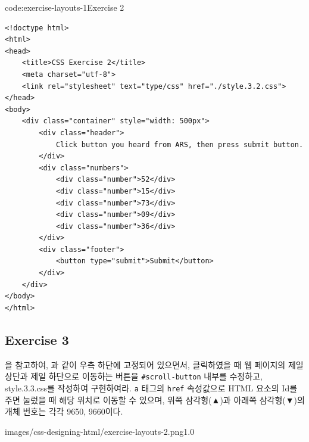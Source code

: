 \begin{codeenv}{code:exercise-layouts-1}{Exercise 2}\begin{verbatim}
<!doctype html>
<html>
<head>
    <title>CSS Exercise 2</title>
    <meta charset="utf-8">
    <link rel="stylesheet" text="type/css" href="./style.3.2.css">
</head>
<body>
    <div class="container" style="width: 500px">
        <div class="header">
            Click button you heard from ARS, then press submit button.
        </div>
        <div class="numbers">
            <div class="number">52</div>
            <div class="number">15</div>
            <div class="number">73</div>
            <div class="number">09</div>
            <div class="number">36</div>
        </div>
        <div class="footer">
            <button type="submit">Submit</button>
        </div>
    </div>
</body>
</html>
\end{verbatim}
\end{codeenv}

\subsection*{Exercise 3}

을 참고하여, 과 같이 우측 하단에 고정되어 있으면서, 클릭하였을 때 웹 페이지의 제일 상단과 제일 하단으로 이동하는 버튼을 \texttt{\#scroll-button} 내부를 수정하고, style.3.3.css를 작성하여 구현하여라. \texttt{a} 태그의 \texttt{href} 속성값으로 HTML 요소의 Id를 주면 눌렀을 때 해당 위치로 이동할 수 있으며, 위쪽 삼각형(▲)과 아래쪽 삼각형(▼)의 개체 번호는 각각 9650, 9660이다.

    {images/css-designing-html/exercise-layouts-2.png}{1.0}

